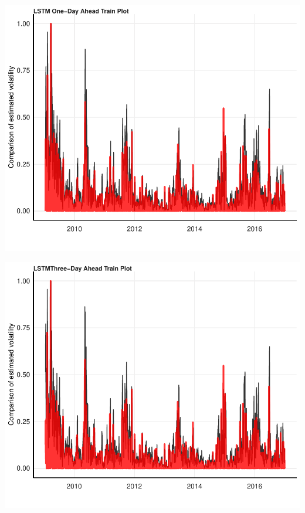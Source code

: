 \documentclass[11pt,preprint, authoryear]{elsarticle}
\let\origfigure\figure
\let\endorigfigure\endfigure
\renewenvironment{figure}[1][2] {
    \expandafter\origfigure\expandafter[H]
} {
    \endorigfigure
}
\numberwithin{equation}{section}
\numberwithin{figure}{section}
\numberwithin{table}{section}
\begin{document}
\begin{figure}[H]

{\centering \includegraphics{Essay_files/figure-latex/plot_3-1} 

}

\caption{LSTM One-Day Ahead Training Forecast}\label{fig:plot_3}
\end{figure}

\begin{figure}[H]

{\centering \includegraphics{Essay_files/figure-latex/plot_4-1} 

}

\caption{LSTM Three-Day Ahead Training Forecast}\label{fig:plot_4}
\end{figure}
\end{document}
